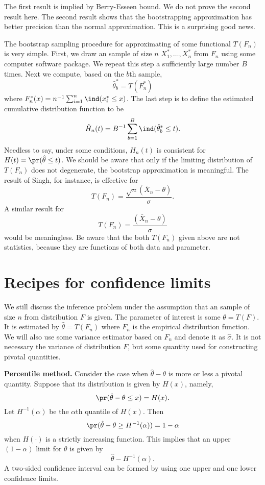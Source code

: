 \vs\vs
The first result is implied by Berry-Esseen bound.
We do not prove the second result here.
The second result shows that the
bootstrapping approximation has better precision than
the normal approximation. This is a surprising good news.

The bootstrap sampling procedure for approximating 
\cdf of some functional $T(F_n)$ is very simple.
First, we draw an \iid sample of size $n$ 
$X_1^*, \ldots, X_n^*$ from $F_n$ using
some computer software package.
We repeat this step a sufficiently large number $B$ times.
Next we compute, based on the $b$th sample, 
\[
\hat \theta^*_b = T(F_n^*)
\]
where $F_n^*(x) = n^{-1} \sum_{i=1}^n \ind (x_i^*\leq x)$.
The last step is to define the estimated cumulative distribution function to be
\[
\hat H_n(t) 
= B^{-1} \sum_{b=1}^B \ind ( \hat \theta^*_b \leq t).
\]
Needless to say, under some conditions, 
$\hat H_n(t) $ is consistent for $H(t) = \pr ( \hat \theta \leq t)$.
We should be aware that only if the limiting distribution of $T(F_n)$ does
not degenerate, the bootstrap approximation is meaningful.
The result of Singh, for instance, is effective for 
\[
T(F_n) =  \frac{\sqrt{n}(\bar X_n- \theta)}{\sigma}.
\]
A similar result for
\[
T(F_n) =  \frac{(\bar X_n- \theta)}{\sigma}
\]
would be meaningless. 
Be aware that the
both $T(F_n)$ given above are not statistics, 
because they are functions of both data
and parameter.


\section{Recipes for confidence limits}

We still discuss the inference problem under the assumption
that an \iid sample of size $n$ from distribution $F$ is given. The parameter
of interest is some $\theta = T(F)$. It is estimated by
$\hat \theta = T(F_n)$ where $F_n$ is the empirical distribution
function. We will also use some variance estimator based on
$F_n$ and denote it as $\hat \sigma$. It is not necessary the
variance of distribution $F$, but some quantity used for
constructing pivotal quantities.

\vs
\noindent
{\bf Percentile method.}
Consider the case when
$\hat \theta - \theta$ is more or less a pivotal quantity.
Suppose that  its distribution is given by $H(x)$, namely, 
\[
\pr ( \hat \theta - \theta \leq x) = H(x).
\]
Let $H^{-1} (\alpha)$ be the $\alpha$th quantile of $H(x)$. 
Then
\[
\pr ( \hat \theta - \theta \geq H^{-1} (\alpha))
= 1 - \alpha
\]
when $H(\cdot)$ is a strictly increasing function.
This implies that an upper $(1-\alpha)$ limit for $\theta$ is given by
\[
\hat \theta - H^{-1} (\alpha).
\]
A two-sided confidence interval can be formed by using one upper
and one lower confidence limits.

